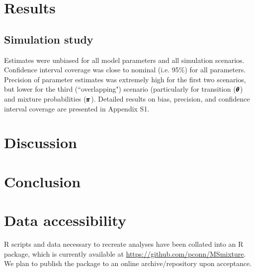 \documentclass[times,mee,doublespace,]{besauth2}
\begin{document}
\section{Results}

\subsection{Simulation study}

Estimates were unbiased for all model parameters and all simulation scenarios.  Confidence interval coverage was close to nominal (i.e. 95\%) for all parameters.  Precision of parameter estimates was extremely high for the first two scenarios, but lower for the third (``overlapping") scenario (particularly for transition ($\pmb{\theta}$) and mixture probabilities ($\pmb{\pi}$).  Detailed results on bias, precision, and confidence interval coverage are presented in Appendix S1.

\section{Discussion}


\section{Conclusion}



\vspace{.3in}
\section{Data accessibility}
R scripts and data necessary to recreate analyses have been collated into an R package, which is currently available at \url{https://github.com/pconn/MSmixture}.  We plan to publish the package to an online archive/repository upon acceptance. \\




\end{document}
